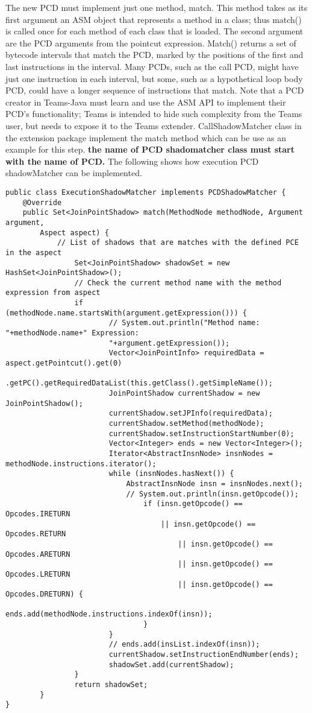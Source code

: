 \documentclass{report}
\begin{document}
The new PCD must implement just one method, match. This method takes as its first argument an ASM object that represents a method in a class; thus match() is called once for each method of each class that is loaded. The second argument are the PCD arguments from the pointcut expression. Match() returns a set of bytecode intervals that match the PCD, marked by the positions of the first and last instructions in the interval. Many PCDs, such as the call PCD, might have just one instruction in each interval, but some, such as a hypothetical loop body PCD, could have a longer sequence of instructions that match. Note that a PCD creator in Teams-Java must learn and use the ASM API to implement their PCD's functionality; Teams is intended to hide such complexity from the Teams user, but needs to expose it to the Teams extender. 
CallShadowMatcher class in the extension package implement the match method which can be use as an example for this step. {\bf the name of PCD shadomatcher class must start with the name of PCD.}
The following shows how execution PCD shadowMatcher can be implemented.
\begin{verbatim}
public class ExecutionShadowMatcher implements PCDShadowMatcher {
    @Override
    public Set<JoinPointShadow> match(MethodNode methodNode, Argument argument,
    	Aspect aspect) {
    	    // List of shadows that are matches with the defined PCE in the aspect
    	    	Set<JoinPointShadow> shadowSet = new HashSet<JoinPointShadow>();
    	    	// Check the current method name with the method expression from aspect
    	    	if (methodNode.name.startsWith(argument.getExpression())) {
    	    	    	// System.out.println("Method name: "+methodNode.name+" Expression:
    	    	    	"+argument.getExpression());
    	    	    	Vector<JoinPointInfo> requiredData = aspect.getPointcut().get(0)
    	    	    	.getPC().getRequiredDataList(this.getClass().getSimpleName());
    	    	    	JoinPointShadow currentShadow = new JoinPointShadow();
    	    	    	currentShadow.setJPInfo(requiredData);
    	    	    	currentShadow.setMethod(methodNode);
    	    	    	currentShadow.setInstructionStartNumber(0);
    	    	    	Vector<Integer> ends = new Vector<Integer>();
    	    	    	Iterator<AbstractInsnNode> insnNodes = methodNode.instructions.iterator();
    	    	    	while (insnNodes.hasNext()) {
    	    	    	    AbstractInsnNode insn = insnNodes.next();
    	    	    	    // System.out.println(insn.getOpcode());
    	    	    	    	if (insn.getOpcode() == Opcodes.IRETURN
    	    	    	    	    || insn.getOpcode() == Opcodes.RETURN
    	    	    	    	    	|| insn.getOpcode() == Opcodes.ARETURN
    	    	    	    	    	|| insn.getOpcode() == Opcodes.LRETURN
    	    	    	    	    	|| insn.getOpcode() == Opcodes.DRETURN) {
    	    	    	    	    	    	ends.add(methodNode.instructions.indexOf(insn));
    	    	    	    	}
    	    	    	}
    	    	    	// ends.add(insList.indexOf(insn));
    	    	    	currentShadow.setInstructionEndNumber(ends);
    	    	    	shadowSet.add(currentShadow);
    	    	}
    	    	return shadowSet;
    	}
}
\end{verbatim}
\end{document}
